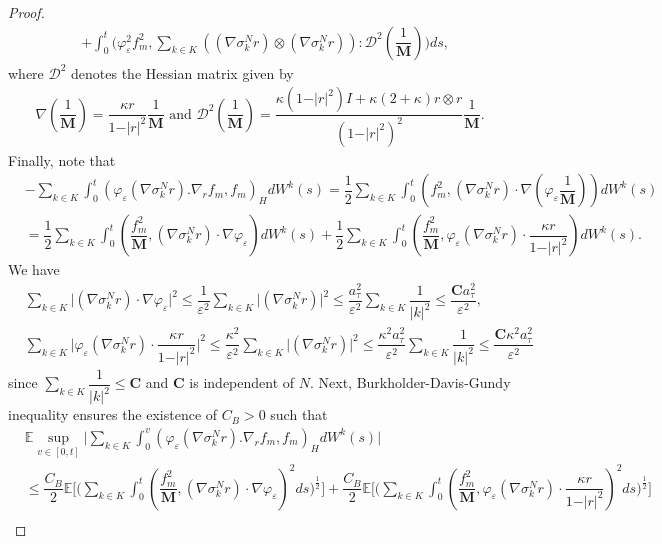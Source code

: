 \documentclass[a4paper,12pt, reqno]{amsart}
\newcommand{\E}{\ensuremath{\mathbb{E}}}
\begin{document}
\begin{proof}
\begin{align*}
    &+ \int_0^t\big(\varphi_\varepsilon^2 f_m^2, \sum_{k\in K} \left((\nabla \sigma_k^Nr) \otimes (\nabla \sigma_k^Nr)\right):\mathcal{D}^2(\dfrac{1}{\mathbf{M}})\big)ds,
\end{align*}
where $\mathcal{D}^2$ denotes the Hessian matrix given by 
\begin{align*}
    \nabla(\dfrac{1}{\mathbf{M}})=\dfrac{\kappa r}{1-\vert r\vert^2}\dfrac{1}{\mathbf{M}} \text{ and }  \mathcal{D}^2(\dfrac{1}{\mathbf{M}})=\dfrac{\kappa(1-\vert r\vert^2)I+\kappa(2+\kappa)r\otimes r}{(1-\vert r\vert^2)^2}\dfrac{1}{\mathbf{M}}.
\end{align*}
Finally, note that
\begin{align*}
   &- \sum_{k\in K}\int_0^t(\varphi_\varepsilon(\nabla \sigma_k^Nr).\nabla_rf_m ,f_m)_H dW^k(s)=\dfrac{1}{2}\sum_{k\in K}\int_0^t(f_m^2 ,(\nabla \sigma_k^Nr)\cdot\nabla(\varphi_\varepsilon \dfrac{1}{\mathbf{M}})) dW^k(s)\\
   &=\dfrac{1}{2}\sum_{k\in K}\int_0^t(\dfrac{f_m^2}{\mathbf{M}} ,(\nabla \sigma_k^Nr)\cdot\nabla\varphi_\varepsilon) dW^k(s)+\dfrac{1}{2}\sum_{k\in K}\int_0^t(\dfrac{f_m^2}{\mathbf{M}}, \varphi_\varepsilon(\nabla \sigma_k^Nr)\cdot \dfrac{\kappa r}{1-\vert r\vert^2} ) dW^k(s).
\end{align*}
We have
\begin{align*}
    & \sum_{k\in K} \vert(\nabla \sigma_k^Nr)\cdot\nabla\varphi_\varepsilon\vert^2 \leq \dfrac{1}{\varepsilon^2} \sum_{k\in K}\vert (\nabla \sigma_k^Nr)\vert^2
     \leq \dfrac{a_\tau^2}{\varepsilon^2} \sum_{k\in K} \dfrac{1}{\vert k\vert^2}\leq  \dfrac{ \mathbf{C}a_\tau^2}{\varepsilon^2}, \\
     & \sum_{k\in K} \vert\varphi_\varepsilon(\nabla \sigma_k^Nr)\cdot \dfrac{\kappa r}{1-\vert r\vert^2}\vert^2 \leq \dfrac{\kappa^2}{\varepsilon^2} \sum_{k\in K}\vert (\nabla \sigma_k^Nr)\vert^2
     \leq \dfrac{\kappa^2 a_\tau^2}{\varepsilon^2} \sum_{k\in K} \dfrac{1}{\vert k\vert^2}\leq  \dfrac{\mathbf{C}\kappa^2 a_\tau^2}{\varepsilon^2}
\end{align*}
since $\sum_{k\in K} \dfrac{1}{\vert k\vert^2}\leq \mathbf{C}$ and $\mathbf{C}$ is independent of $N$. Next, Burkholder-Davis-Gundy inequality ensures the existence of $C_B>0$ such that 
\begin{align*}
  &\E \sup_{v\in[0,t]}   \vert \sum_{k\in K}\int_0^v(\varphi_\varepsilon(\nabla \sigma_k^Nr).\nabla_rf_m ,f_m)_H dW^k(s)\vert \\
  &\leq  \dfrac{C_B}{2}\E\Big[\big(\sum_{k\in K}\int_0^t(\dfrac{f_m^2}{\mathbf{M}} ,(\nabla \sigma_k^Nr)\cdot\nabla\varphi_\varepsilon)^2 ds\big)^{\frac{1}{2}} \Big]+\dfrac{C_B}{2}\E\Big[(\sum_{k\in K}\int_0^t(\dfrac{f_m^2}{\mathbf{M}}, \varphi_\varepsilon(\nabla \sigma_k^Nr)\cdot \dfrac{\kappa r}{1-\vert r\vert^2} )^2 ds\big)^{\frac{1}{2}} \Big]\\

\end{align*}
\end{proof}
\end{document}
